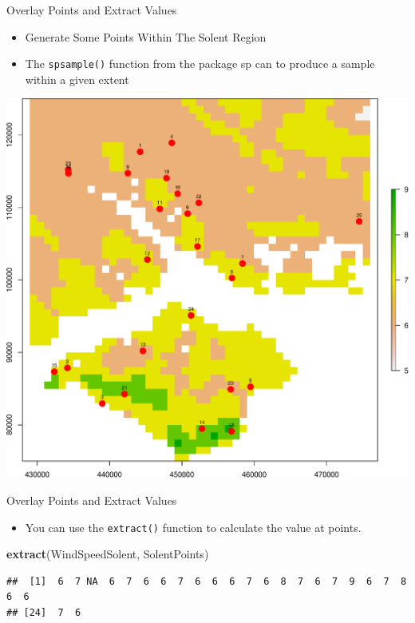 \documentclass[10pt,ignorenonframetext,]{beamer}
\newenvironment{Shaded}{\begin{snugshade}}{\end{snugshade}}
\newcommand{\KeywordTok}[1]{\textcolor[rgb]{0.13,0.29,0.53}{\textbf{{#1}}}}
\newcommand{\DataTypeTok}[1]{\textcolor[rgb]{0.13,0.29,0.53}{{#1}}}
\newcommand{\DecValTok}[1]{\textcolor[rgb]{0.00,0.00,0.81}{{#1}}}
\newcommand{\StringTok}[1]{\textcolor[rgb]{0.31,0.60,0.02}{{#1}}}
\newcommand{\NormalTok}[1]{{#1}}
\providecommand{\tightlist}{%
  \setlength{\itemsep}{0pt}\setlength{\parskip}{0pt}}
\begin{document}
\begin{frame}[fragile]{Overlay Points and Extract Values}

\begin{itemize}
\tightlist
\item
  Generate Some Points Within The Solent Region
\item
  The \texttt{spsample()} function from the package \alert{sp} can to
  produce a sample within a given extent
\end{itemize}

\begin{Shaded}
\end{Shaded}

\begin{center}\includegraphics[width=0.45\linewidth]{SpatialDataLecture_files/figure-beamer/extract_vals_at_pts01-1} \end{center}

\end{frame}

\begin{frame}[fragile]{Overlay Points and Extract Values}

\begin{itemize}
\tightlist
\item
  You can use the \texttt{extract()} function to calculate the value at
  points.
\end{itemize}

\begin{Shaded}
\begin{Highlighting}[]
\KeywordTok{extract}\NormalTok{(WindSpeedSolent, SolentPoints)}
\end{Highlighting}
\end{Shaded}

\begin{verbatim}
##  [1]  6  7 NA  6  7  6  6  7  6  6  6  7  6  8  7  6  7  9  6  7  8  6  6
## [24]  7  6
\end{verbatim}

\end{frame}
\end{document}
